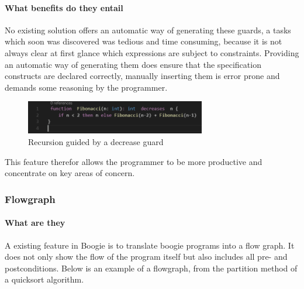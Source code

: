 \paragraph{What benefits do they entail}
No existing solution offers an automatic way of generating these guards, a tasks which soon was discovered was tedious and time consuming, because it is not always clear at first glance which expressions are subject to constraints. Providing an automatic way of generating them does ensure that the specification constructs are declared correctly, manually inserting them is error prone and demands some reasoning by the programmer.  \newline
\begin{figure}[H]
	\centering
	\includegraphics[width=0.7\textwidth]{img/decreaseGuardApplied}
	\caption{Recursion guided by a decrease guard}
	\label{fig:dfdecreaseguardapplied}
\end{figure}
This feature therefor allows the programmer to be more productive and concentrate on key areas of concern.




\subsubsection{Flowgraph}

\paragraph{What are they}
A existing feature in Boogie is to translate boogie programs into a flow graph. It does not only show the flow of the program itself but also includes all pre- and postconditions. Below is an example of a flowgraph, from the partition method of a quicksort algorithm.  

